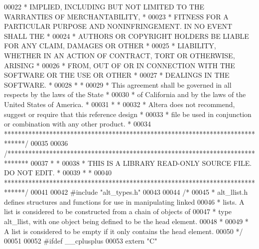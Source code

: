 \begin{DoxyCode}
00022 \textcolor{comment}{* IMPLIED, INCLUDING BUT NOT LIMITED TO THE WARRANTIES OF MERCHANTABILITY,    *}
00023 \textcolor{comment}{* FITNESS FOR A PARTICULAR PURPOSE AND NONINFRINGEMENT. IN NO EVENT SHALL THE *}
00024 \textcolor{comment}{* AUTHORS OR COPYRIGHT HOLDERS BE LIABLE FOR ANY CLAIM, DAMAGES OR OTHER      *}
00025 \textcolor{comment}{* LIABILITY, WHETHER IN AN ACTION OF CONTRACT, TORT OR OTHERWISE, ARISING     *}
00026 \textcolor{comment}{* FROM, OUT OF OR IN CONNECTION WITH THE SOFTWARE OR THE USE OR OTHER         *}
00027 \textcolor{comment}{* DEALINGS IN THE SOFTWARE.                                                   *}
00028 \textcolor{comment}{*                                                                             *}
00029 \textcolor{comment}{* This agreement shall be governed in all respects by the laws of the State   *}
00030 \textcolor{comment}{* of California and by the laws of the United States of America.              *}
00031 \textcolor{comment}{*                                                                             *}
00032 \textcolor{comment}{* Altera does not recommend, suggest or require that this reference design    *}
00033 \textcolor{comment}{* file be used in conjunction or combination with any other product.          *}
00034 \textcolor{comment}{******************************************************************************/}
00035 
00036 \textcolor{comment}{/******************************************************************************}
00037 \textcolor{comment}{*                                                                             *}
00038 \textcolor{comment}{* THIS IS A LIBRARY READ-ONLY SOURCE FILE. DO NOT EDIT.                       *}
00039 \textcolor{comment}{*                                                                             *}
00040 \textcolor{comment}{******************************************************************************/}
00041 
00042 \textcolor{preprocessor}{#include "alt_types.h"}
00043 
00044 \textcolor{comment}{/*}
00045 \textcolor{comment}{ * alt\_llist.h defines structures and functions for use in manipulating linked}
00046 \textcolor{comment}{ * lists. A list is considered to be constructed from a chain of objects of}
00047 \textcolor{comment}{ * type alt\_llist, with one object being defined to be the head element. }
00048 \textcolor{comment}{ *}
00049 \textcolor{comment}{ * A list is considered to be empty if it only contains the head element.}
00050 \textcolor{comment}{ */}
00051 
00052 \textcolor{preprocessor}{#ifdef \_\_cplusplus}
00053 \textcolor{keyword}{extern} \textcolor{stringliteral}{"C"}

\end{DoxyCode}
